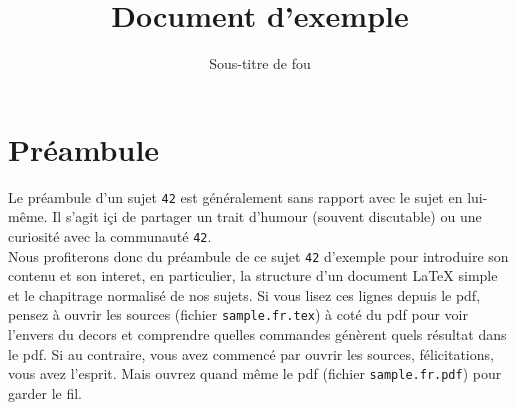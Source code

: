 \documentclass{42-fr}
\begin{document}
                           \title{Document d'exemple}
                          \subtitle{Sous-titre de fou}


\maketitle

\tableofcontents


\chapter{Préambule}

    Le pr\'eambule d'un sujet \texttt{42} est g\'en\'eralement sans
    rapport avec le sujet en lui-m\^eme. Il s'agit i\c ci de partager
    un trait d'humour (souvent discutable) ou une curiosit\'e avec la
    communaut\'e \texttt{42}.\\










    Nous profiterons donc du pr\'eambule de ce sujet \texttt{42}
    d'exemple pour introduire son contenu et son interet, en
    particulier, la structure d'un document LaTeX simple et le
    chapitrage normalis\'e de nos sujets. Si vous lisez ces lignes
    depuis le pdf, pensez \`a ouvrir les sources (fichier
    \texttt{sample.fr.tex}) \`a cot\'e du pdf pour voir l'envers du
    decors et comprendre quelles commandes g\'en\`erent quels
    r\'esultat dans le pdf. Si au contraire, vous avez commenc\'e par
    ouvrir les sources, f\'elicitations, vous avez l'esprit. Mais
    ouvrez quand m\^eme le pdf (fichier \texttt{sample.fr.pdf}) pour
    garder le fil.\\
\end{document}
